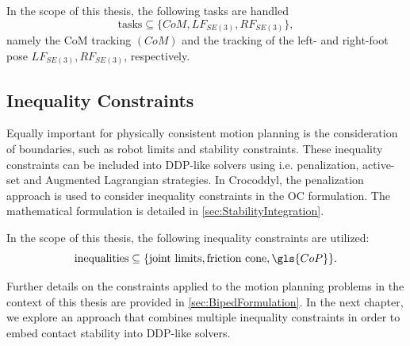 In the scope of this thesis, the following tasks are handled
\begin{equation*}
\text{tasks} \subseteq \{CoM, LF_{SE(3)}, RF_{SE(3)}\}, 
\end{equation*}
namely the \gls{CoM} tracking $(CoM)$ and the tracking of the left- and right-foot pose $LF_{SE(3)}, RF_{SE(3)}$, respectively.

\subsection{Inequality Constraints}
Equally important for physically consistent motion planning is the consideration of boundaries, such as robot limits and stability constraints. These inequality constraints can be included into \gls{DDP}-like solvers using i.e. penalization, active-set \cite{xie2017differential} and Augmented Lagrangian \cite{howell2019altro} strategies. In Crocoddyl, the penalization approach is used to consider inequality constraints in the \gls{OC} formulation. The mathematical formulation is detailed in \cref{sec:StabilityIntegration}. 

In the scope of this thesis, the following inequality constraints are utilized:
\begin{equation*}
\text{inequalities} \subseteq \{\text{joint limits}, \text{friction cone}, \gls{CoP}\}.
\end{equation*}

Further details on the constraints applied to the motion planning problems in the context of this thesis are provided in \cref{sec:BipedFormulation}. In the next chapter, we explore an approach that combines multiple inequality constraints in order to embed contact stability into \gls{DDP}-like solvers. 